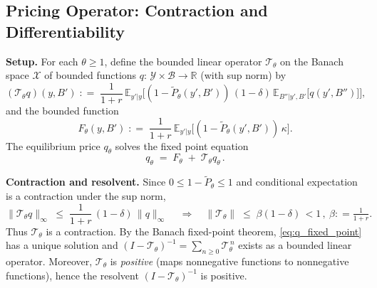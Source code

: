 \documentclass[12pt]{article}
\providecommand{\coloneqq}{\mathrel{\mathop:}=}
\theoremstyle{plain}
\newcommand{\E}{\mathbb{E}}
\newcommand{\Y}{\mathcal{Y}}
\begin{document}
\subsection{Pricing Operator: Contraction and Differentiability}\label{app:operator_analysis}
\textbf{Setup.} For each \(\theta\ge 1\), define the bounded linear operator \(\mathcal T_\theta\) on the Banach space \(\mathcal X\) of bounded functions \(q:\,\Y\times\mathcal B\to\mathbb R\) (with sup norm) by
\begin{equation}\label{eq:Ttheta_def}
	(\mathcal T_\theta q)(y,B')\;\coloneqq\;\frac{1}{1+r}\,\E_{y'|y}\Big[(1-\tilde P_\theta(y',B'))\,(1-\delta)\,\E_{B''|y',B'}\big[q(y',B'')\big]\Big],
\end{equation}
and the bounded function
\begin{equation}\label{eq:Ftheta_def}
	F_\theta(y,B')\;\coloneqq\;\frac{1}{1+r}\,\E_{y'|y}\Big[(1-\tilde P_\theta(y',B'))\,\kappa\Big].
\end{equation}
The equilibrium price \(q_\theta\) solves the fixed point equation
\begin{equation}\label{eq:q_fixed_point}
	q_\theta\;=\;F_\theta\;+\;\mathcal T_\theta q_\theta\,.
\end{equation}

\textbf{Contraction and resolvent.} Since \(0\le 1-\tilde P_\theta\le 1\) and conditional expectation is a contraction under the sup norm,
\begin{equation}\label{eq:Ttheta_norm}
	\|\mathcal T_\theta q\|_\infty\;\le\;\frac{1}{1+r}\,(1-\delta)\,\|q\|_\infty\,\quad\Rightarrow\quad\|\mathcal T_\theta\|\;\le\;\beta(1-\delta)\,<1\,,\ \beta\coloneqq\tfrac{1}{1+r}.
\end{equation}
Thus \(\mathcal T_\theta\) is a contraction. By the Banach fixed-point theorem, \eqref{eq:q_fixed_point} has a unique solution and
\((I-\mathcal T_\theta)^{-1}=\sum_{n\ge 0}\mathcal T_\theta^{\,n}\) exists as a bounded linear operator. Moreover, \(\mathcal T_\theta\) is \emph{positive} (maps nonnegative functions to nonnegative functions), hence the resolvent \((I-\mathcal T_\theta)^{-1}\) is positive.
\end{document}
